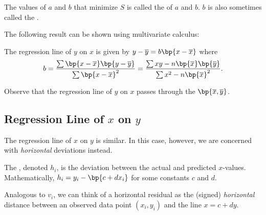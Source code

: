 The values of $a$ and $b$ that minimize $S$ is called the  of $a$ and $b$. $b$ is also sometimes called the .

The following result can be shown using multivariate calculus:

\begin{proposition}
    The regression line of $y$ on $x$ is given by $y - \ol{y} = b \bp{x - \ol{x}}$ where \[b = \frac{\sum \bp{x-\ol{x}} \bp{y - \ol{y}}}{\sum \bp{x-\ol{x}}^2} = \frac{\sum xy - n \bp{\ol{x}}\bp{\ol{y}}}{\sum x^2 - n \bp{\ol{x}}^2}.\]
\end{proposition}

Observe that the regression line of $y$ on $x$ passes through the  $\bp{\ol{x}, \ol{y}}$.

\subsection{Regression Line of $x$ on $y$}

The regression line of $x$ on $y$ is similar. In this case, however, we are concerned with \emph{horizontal} deviations instead.

\begin{definition}
    The , denoted $h_i$, is the deviation between the actual and predicted $x$-values. Mathematically, $h_i = y_i - \bp{c + d x_i}$ for some constants $c$ and $d$.
\end{definition}

Analogous to $v_i$, we can think of a horizontal residual as the (signed) \emph{horizontal} distance between an observed data point $(x_i, y_i)$ and the line $x = c + dy$.

